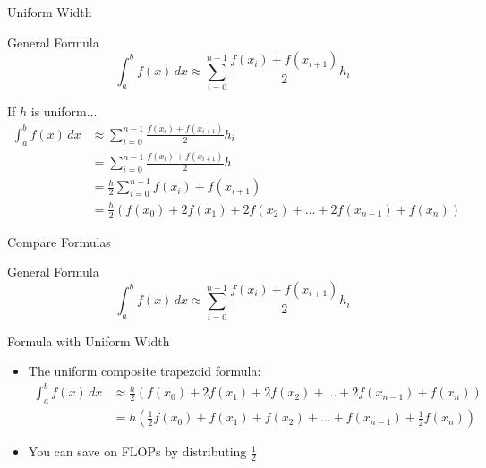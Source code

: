 \documentclass[10pt]{beamer}
\begin{document}
\begin{frame}{Uniform Width}

\begin{block}{General Formula}
$$
\int_a^b f(x)\,dx \approx \sum_{i=0}^{n-1}\frac{f(x_i)+f(x_{i+1})}{2} h_i
$$
\end{block}
If $h$ is uniform...
    \begin{align*}
      \int_a^b f(x)\,dx &\approx \sum_{i=0}^{n-1}\frac{f(x_i)+f(x_{i+1})}{2} h_i\\ 
       &= \sum_{i=0}^{n-1}\frac{f(x_i)+f(x_{i+1})}{2} h\\ 
       &= \frac{h}{2}\sum_{i=0}^{n-1}f(x_i)+f(x_{i+1})\\  
       &= \frac{h}{2}\left(f(x_0) + 2 f(x_1) + 2f(x_2) + \dots + 2 f(x_{n-1}) + f(x_n)\right)
    \end{align*}
\begin{center}
\end{center}
\end{frame}
\begin{frame}[fragile]{Compare Formulas}

\begin{block}{General Formula}
$$
\int_a^b f(x)\,dx \approx \sum_{i=0}^{n-1}\frac{f(x_i)+f(x_{i+1})}{2} h_i
$$
\end{block}

\begin{block}{Formula with Uniform Width}
\begin{itemize}
    
  \item The uniform composite trapezoid formula:
\begin{align*}
    \int_a^b f(x)\,dx &\approx \frac{h}{2}\left(f(x_0) + 2 f(x_1) + 2f(x_2) + \dots + 2 f(x_{n-1}) + f(x_n)\right)\\
          &=      h    \left(\frac{1}{2} f(x_0) +   f(x_1) +  f(x_2) + \dots +   f(x_{n-1}) + \frac{1}{2} f(x_n)\right)
\end{align*}
    \item You can save on FLOPs by distributing $\frac12$ 
\end{itemize}
\end{block}
\end{frame}

\end{document}
